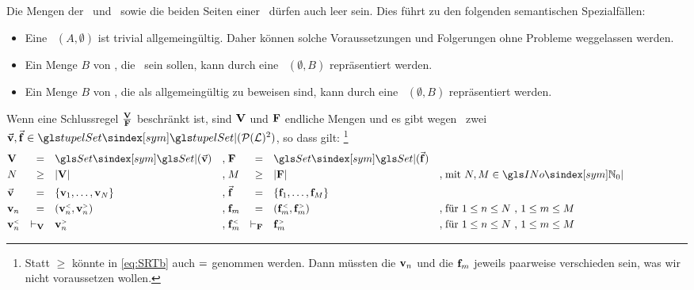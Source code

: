 Die Mengen der \Voraussetzungen\ und \Folgerungen\ sowie die beiden Seiten einer \Ableitung\ dürfen auch leer sein.
Dies führt zu den folgenden semantischen Spezialfällen:
\begin{itemize}
	\item Eine \Ableitung\ $(A,\emptyset)$ ist trivial allgemeingültig.
	Daher können solche Voraussetzungen und Folgerungen ohne Probleme weggelassen werden.
	\item Ein Menge $B$ von \Formeln, die \Axiome\ sein sollen, kann durch eine \Voraussetzung\ $(\emptyset,B)$ repräsentiert werden.
	\item Ein Menge $B$ von \Formeln, die als allgemeingültig zu beweisen sind, kann durch eine \Folgerung\ $(\emptyset,B)$ repräsentiert werden.
\end{itemize}
%
Wenn eine Schlussregel $\frac{\mathbf{V}}{\mathbf{F}}$ beschränkt ist, sind $\mathbf{V}$ und $\mathbf{F}$ endliche Mengen und es gibt wegen~ zwei \Tupel\ $\vec{\prerequisite}, \vec{\conclusion} \in \glsSxm{tupelSet}(\deriveSet)$, so dass gilt:
\footnote{%
	Statt $\ge$ könnte in \eqref{eq:SRTb} auch $=$ genommen werden.
	Dann müssten die $\mathbf{v}_n$ und die $\mathbf{f}_m$ jeweils paarweise verschieden sein, was wir nicht voraussetzen wollen.
}
\begin{align}
	&     \prerequisiteSet      & \eq \quad & \glsSxm{Set}(\vec{\prerequisite})
	&,\;& \conclusionSet        & \eq \quad & \glsSxm{Set}(\vec{\conclusion})
	\label{eq:SRTa}  \\
	&     N                     & \ge \quad & |\prerequisiteSet|
	&,\;& M                     & \ge \quad & |\conclusionSet|
	&,\;& \text{mit } N, M \in \symINo
	\label{eq:SRTb}          \\
	& \vec{\prerequisite}       & \eq \quad & \{\prerequisite_1,\dots,\prerequisite_N \}
	&,\;& \vec{\conclusion}     & \eq \quad & \{\conclusion_1,\dots,\conclusion_M\}
	\label{eq:SRTc}          \\
	&       \prerequisite_n     & \eq \quad & ( \links{\prerequisite}_n, \rechts{\prerequisite}_n )
	&,\;& \conclusion_m         & \eq \quad & ( \links{\conclusion}_m, \rechts{\conclusion}_m )
	&,\;& \text{für } 1 \le n \le N \text{ , } 1 \le m \le M
	\label{eq:SRTd}          \\
	& \links{\prerequisite}_n   & \derive_\prerequisiteSet \quad & \rechts{\prerequisite}_n
	&,\;& \links{\conclusion}_m & \derive_\conclusionSet   \quad & \rechts{\conclusion}_m
	&,\;& \text{für } 1 \le n \le N \text{ , } 1 \le m \le M
	\label{eq:SRTe}          \formulatoleft
\end{align}
